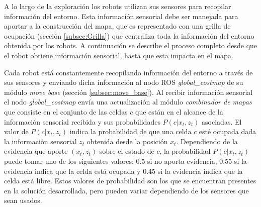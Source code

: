 
A lo largo de la exploración los robots utilizan sus sensores para recopilar
información del entorno. Esta información sensorial debe ser manejada para
aportar a la construcción del mapa, que es representado con una grilla de
ocupación (sección \ref{subsec:Grilla}) que centraliza toda la información del
entorno obtenida por los robots. A continuación se describe el proceso completo
desde que el robot obtiene información sensorial, hasta que esta impacta en el
mapa.


Cada robot está constantemente recopilando información del entorno a través de
sus sensores y enviando dicha información al nodo \gls{ROS}
\emph{global\_costmap} de su módulo \emph{move base} (sección
\ref{subsec:move_base}). Al recibir información sensorial el nodo
\emph{global\_costmap} envía una actualización al módulo \emph{combinador de
mapas} que consiste en el conjunto de las celdas $c$ que están en el alcance de
la información sensorial recibida y sus probabilidades $P(c | x_t,z_t)$ asociadas. El
valor de $P(c|x_t,z_t)$ indica la probabilidad de que una celda
$c$ esté ocupada dada la información sensorial $z_t$ obtenida desde la posición
$x_t$. Dependiendo de la evidencia que aporte $(x_t,z_t)$ sobre el estado de
$c$, la probabilidad $P(c|x_t,z_t)$ puede tomar uno de los siguientes
valores: $0.5$ si no aporta evidencia, $0.55$ si la evidencia indica que la
celda está ocupada y $0.45$ si la evidencia indica que la celda está libre.
Estos valores de probabilidad son los que se encuentran presentes en la
solución desarrollada, pero pueden variar dependiendo de los sensores que sean
usados. 



